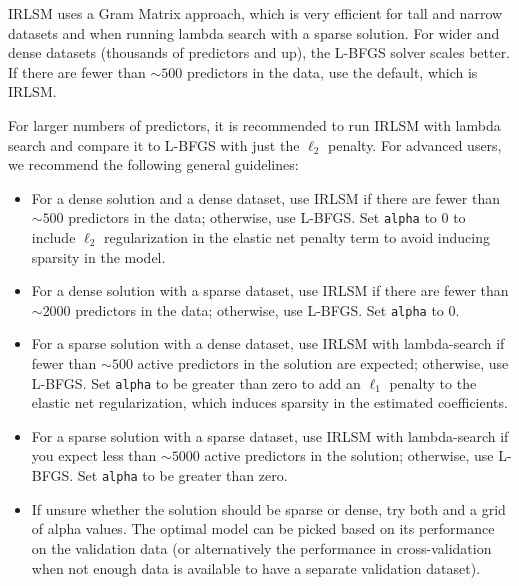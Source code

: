 IRLSM uses a Gram Matrix approach, which is very efficient for tall and narrow datasets and when running lambda search with a sparse solution.  For wider and dense datasets (thousands of predictors and up), the L-BFGS solver scales better. If there are fewer than $\sim 500$ predictors in the data, use the default, which is IRLSM. 

For larger numbers of predictors, it is recommended to run IRLSM with lambda search and compare it to L-BFGS with just the $\ell_2$ penalty. For advanced users, we recommend the following general guidelines:
\begin{itemize}
\item For a dense solution and a dense dataset, use IRLSM if there are fewer than $\sim 500$ predictors in the data; otherwise, use L-BFGS. Set \texttt{alpha} to 0 to include $\ell_2$ regularization in the elastic net penalty term to avoid inducing sparsity in the model.
\item For a dense solution with a sparse dataset, use IRLSM if there are fewer than $\sim 2000$ predictors in the data; otherwise, use L-BFGS. Set \texttt{alpha} to 0.
\item For a sparse solution with a dense dataset, use IRLSM with lambda-search if fewer than $\sim 500$ active predictors in the solution are expected; otherwise, use L-BFGS. Set \texttt{alpha} to be greater than zero to add an $\ell_1$ penalty to the elastic net regularization, which induces sparsity in the estimated coefficients. 
\item For a sparse solution with a sparse dataset, use IRLSM with lambda-search if you expect less than $\sim 5000$ active predictors in the solution; otherwise, use L-BFGS. Set \texttt{alpha} to be greater than zero. 
\item If unsure whether the solution should be sparse or dense, try both and a grid of alpha values. The optimal model can be picked based on its performance on the validation data (or alternatively the performance in cross-validation when not enough data is available to have a separate validation dataset).      
\end{itemize}

